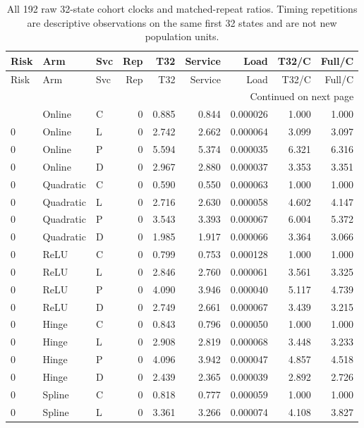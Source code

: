 \begingroup
\scriptsize
\setlength{\tabcolsep}{3pt}
\begin{longtable}{lllrrrrrr}
\caption{All 192 raw 32-state cohort clocks and matched-repeat ratios. Timing repetitions are descriptive observations on the same first 32 states and are not new population units.}\label{tab:allclocks120}\\
\toprule
Risk & Arm & Svc & Rep & T32 & Service & Load & T32/C & Full/C \\ \midrule
\endfirsthead
\toprule
Risk & Arm & Svc & Rep & T32 & Service & Load & T32/C & Full/C \\ \midrule
\endhead
\midrule\multicolumn{9}{r}{Continued on next page}\\\endfoot
\bottomrule\endlastfoot
0 & Online & C & 0 & 0.885 & 0.844 & 0.000026 & 1.000 & 1.000 \\
0 & Online & L & 0 & 2.742 & 2.662 & 0.000064 & 3.099 & 3.097 \\
0 & Online & P & 0 & 5.594 & 5.374 & 0.000035 & 6.321 & 6.316 \\
0 & Online & D & 0 & 2.967 & 2.880 & 0.000037 & 3.353 & 3.351 \\
0 & Quadratic & C & 0 & 0.590 & 0.550 & 0.000063 & 1.000 & 1.000 \\
0 & Quadratic & L & 0 & 2.716 & 2.630 & 0.000058 & 4.602 & 4.147 \\
0 & Quadratic & P & 0 & 3.543 & 3.393 & 0.000067 & 6.004 & 5.372 \\
0 & Quadratic & D & 0 & 1.985 & 1.917 & 0.000066 & 3.364 & 3.066 \\
0 & ReLU & C & 0 & 0.799 & 0.753 & 0.000128 & 1.000 & 1.000 \\
0 & ReLU & L & 0 & 2.846 & 2.760 & 0.000061 & 3.561 & 3.325 \\
0 & ReLU & P & 0 & 4.090 & 3.946 & 0.000040 & 5.117 & 4.739 \\
0 & ReLU & D & 0 & 2.749 & 2.661 & 0.000067 & 3.439 & 3.215 \\
0 & Hinge & C & 0 & 0.843 & 0.796 & 0.000050 & 1.000 & 1.000 \\
0 & Hinge & L & 0 & 2.908 & 2.819 & 0.000068 & 3.448 & 3.233 \\
0 & Hinge & P & 0 & 4.096 & 3.942 & 0.000047 & 4.857 & 4.518 \\
0 & Hinge & D & 0 & 2.439 & 2.365 & 0.000039 & 2.892 & 2.726 \\
0 & Spline & C & 0 & 0.818 & 0.777 & 0.000059 & 1.000 & 1.000 \\
0 & Spline & L & 0 & 3.361 & 3.266 & 0.000074 & 4.108 & 3.827 \\

\end{longtable}
